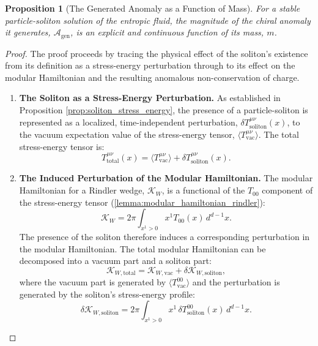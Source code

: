 \documentclass[11pt, letterpaper]{report}
\theoremstyle{plain} %
\newtheorem{proposition}[theorem]{Proposition}
\theoremstyle{definition} %
\theoremstyle{remark} %
\newcommand{\ModularK}{\mathcal{K}}
\begin{document}
\begin{proposition}[The Generated Anomaly as a Function of Mass]
\label{prop:anomaly_function_of_mass}
For a stable particle-soliton solution of the entropic fluid, the magnitude of the chiral anomaly it generates, $\mathcal{A}_{\text{gen}}$, is an explicit and continuous function of its mass, $m$.
\end{proposition}
\begin{proof}
The proof proceeds by tracing the physical effect of the soliton's existence from its definition as a stress-energy perturbation through to its effect on the modular Hamiltonian and the resulting anomalous non-conservation of charge.

\begin{enumerate}
    \item \textbf{The Soliton as a Stress-Energy Perturbation.}
    As established in Proposition \ref{prop:soliton_stress_energy}, the presence of a particle-soliton is represented as a localized, time-independent perturbation, $\delta T^{\mu\nu}_{\text{soliton}}(x)$, to the vacuum expectation value of the stress-energy tensor, $\langle T^{\mu\nu}_{\text{vac}} \rangle$. The total stress-energy tensor is:
    \begin{equation}
        T^{\mu\nu}_{\text{total}}(x) = \langle T^{\mu\nu}_{\text{vac}} \rangle + \delta T^{\mu\nu}_{\text{soliton}}(x).
    \end{equation}

    \item \textbf{The Induced Perturbation of the Modular Hamiltonian.}
    The modular Hamiltonian for a Rindler wedge, $\ModularK_W$, is a functional of the $T_{00}$ component of the stress-energy tensor (\cref{lemma:modular_hamiltonian_rindler}):
    $$ \ModularK_W = 2\pi \int_{x^1>0} x^1 T_{00}(x) \, d^{d-1}x. $$
    The presence of the soliton therefore induces a corresponding perturbation in the modular Hamiltonian. The total modular Hamiltonian can be decomposed into a vacuum part and a soliton part:
    \begin{equation}
        \ModularK_{W, \text{total}} = \ModularK_{W, \text{vac}} + \delta\ModularK_{W, \text{soliton}},
    \end{equation}
    where the vacuum part is generated by $\langle T^{00}_{\text{vac}} \rangle$ and the perturbation is generated by the soliton's stress-energy profile:
    \begin{equation}
        \delta\ModularK_{W, \text{soliton}} = 2\pi \int_{x^1>0} x^1 \, \delta T^{00}_{\text{soliton}}(x) \, d^{d-1}x.
        \label{eq:delta_K_soliton}
    \end{equation}


\end{enumerate}
\end{proof}
\end{document}
